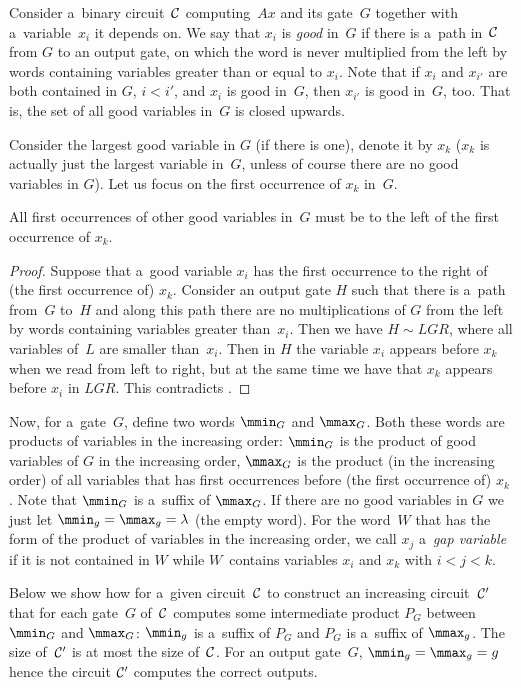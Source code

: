 \documentclass{toc}
\begin{document}
Consider a~binary circuit~${\cal C}$ computing~$Ax$ and its gate~$G$ together with a~variable~$x_i$ it depends on.
We say that $x_i$ is \emph{good} in~$G$ if there is
a~path in~${\cal C}$ from $G$ to an output gate, on which the word is never multiplied from the left by words containing variables greater than or equal to $x_i$.
Note that if $x_i$ and $x_{i'}$ are both contained in $G$, $i<i'$, and $x_i$ is good in~$G$, then $x_{i'}$ is good in~$G$, too. That is, the set of all good variables in~$G$ is closed upwards.

Consider the largest good variable in $G$ (if there is one), denote it by $x_k$ ($x_k$ is actually just the largest variable in~$G$, unless of course there are no good variables in $G$). Let us focus on the first occurrence of $x_k$ in~$G$.

\begin{claim}
    All first occurrences of other good variables in~$G$ must be to the left of the first occurrence of $x_k$.
\end{claim}

\begin{proof}
    Suppose that a~good variable $x_i$ has the first occurrence to the right of (the first occurrence of) $x_k$. Consider an output gate $H$ such that there is a~path from~$G$ to~$H$ and along this path there are no multiplications of $G$ from the left by words containing variables greater than~$x_i$. Then we have $H \sim LGR$, where all variables of~$L$ are smaller than~$x_i$. Then in $H$ the variable $x_i$ appears before $x_k$ when we read from left to right, but at the same time we have that $x_k$ appears before $x_i$ in $LGR$. This contradicts .
\end{proof}

Now, for a~gate~$G$, define two words $\mmin_G$ and $\mmax_G$. Both these words are products of variables in the increasing order: $\mmin_G$ is the product of good variables of $G$ in the increasing order, $\mmax_G$ is the product (in the increasing order) of all variables that has first occurrences before (the first occurrence of) $x_k$. Note that $\mmin_G$ is
a~suffix of $\mmax_G$. If there are no good variables in $G$ we just let $\mmin_g=\mmax_g=\lambda$ (the empty word).
%
For the word~$W$ that has the form of the product of variables in the increasing order, we call $x_j$ a~\emph{gap variable} if it is not contained in $W$
while $W$~contains variables $x_i$ and $x_k$ with $i < j < k$.

Below we show how for a~given circuit~${\cal C}$ to construct an increasing circuit~${\cal C}'$ that for each gate~$G$ of~${\cal C}$ computes some intermediate product $P_G$ between $\mmin_G$ and $\mmax_G$: $\mmin_g$ is a~suffix of $P_G$ and $P_G$ is a~suffix of $\mmax_g$. The size of~${\cal C}'$ is at most the size of~${\cal C}$. For an output gate~$G$, $\mmin_g=\mmax_g=g$ hence the circuit ${\cal C}'$ computes the correct outputs.
\end{document}
